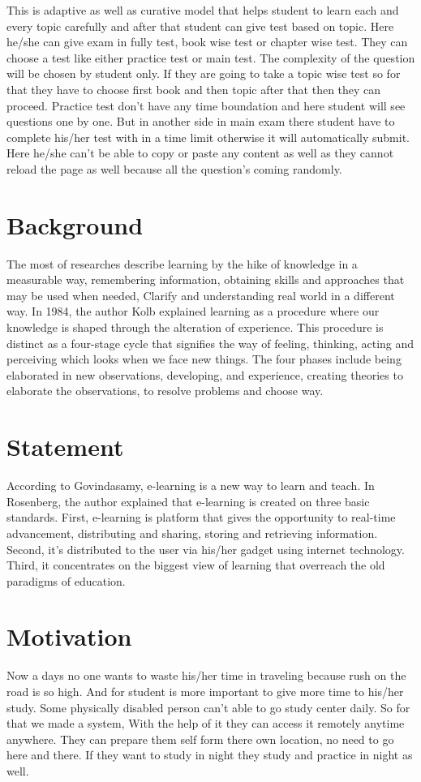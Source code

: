 This is adaptive as well as curative model that helps student to learn each and every topic carefully and after that student can give test based on topic. Here he/she can give exam in fully test, book wise test or chapter wise test. They can choose a test like either practice test or main test. The complexity of the question will be chosen by student only. If they are going to take a topic wise test so for that they have to choose first book and then topic after that then they can proceed. Practice test don't have any time boundation and here student will see questions one by one. But in another side in main exam there student have to complete his/her test with in a time limit otherwise it will automatically submit. Here he/she can't be able to copy or paste any content as well as they cannot reload the page as well because all the question’s coming randomly.


\section{Background}
The most of researches describe learning by the hike of knowledge in a measurable way, remembering information, obtaining skills and approaches that may be used when needed, Clarify and understanding real world in a different way. In 1984, the author Kolb explained learning as a procedure where our knowledge is shaped through the alteration of experience. This procedure is distinct as a four-stage cycle that signifies the way of feeling, thinking, acting and perceiving which looks when we face new things. The four phases include being elaborated in new observations, developing, and experience, creating theories to elaborate the observations, to resolve problems and choose way.
\section{Statement}
According to Govindasamy, e-learning is a new way to learn and teach. In Rosenberg, the author explained that e-learning is created on three basic standards. First, e-learning is platform that gives the opportunity to real-time advancement, distributing and sharing, storing and retrieving information. Second, it’s distributed to the user via his/her gadget using internet technology. Third, it concentrates on the biggest view of learning that overreach the old paradigms of education.
\section{Motivation}
Now a days no one wants to waste his/her time in traveling because rush on the road is so high. And for student is more important to give more time to his/her study. Some physically disabled person can't able to go study center daily. So for that we made a system, With the help of it they can access it remotely anytime anywhere. They can prepare them self form there own location, no need to go here and there. If they want to study in night they study and practice in night as well.
